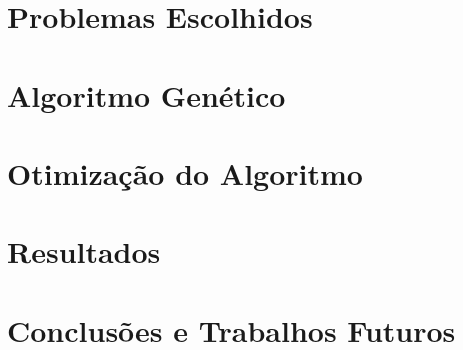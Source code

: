 \documentclass[12pt,plainheader,pnumplain]{abnt}
\newcommand{\oes}{\~oes }
\begin{document}
\chapter{Problemas Escolhidos}


\chapter{Algoritmo Gen\'etico}


\chapter{Otimização do Algoritmo}


\chapter{Resultados}


\chapter{Conclus\oes e Trabalhos Futuros}



%

%

%

%

%
\end{document}

